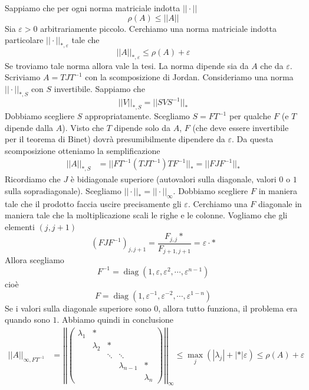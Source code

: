 \documentclass[a4paper]{article}
\begin{document}
\begin{snippetproof}{}
    Sappiamo che per ogni norma matriciale indotta \(||\cdot||\) \[
        \rho(A) \leq ||A||
    \]
    Sia \(\varepsilon > 0\) arbitrariamente piccolo.
    Cerchiamo una norma matriciale indotta particolare
    \(||\cdot||_{\ast, \varepsilon}\) tale che
    \[
        ||A||_{\ast, \varepsilon} \leq \rho(A) + \varepsilon
    \]
    Se troviamo tale norma allora vale la tesi.
    La norma dipende sia da \(A\) che da \(\varepsilon\).
    Scriviamo \(A = TJT^{-1}\) con la scomposizione di Jordan.
    Consideriamo una norma \(||\cdot||_{\ast, S}\) con \(S\) invertibile. Sappiamo che
    \[
        ||V||_{\ast, S} = ||SVS^{-1}||_\ast
    \]
    Dobbiamo scegliere \(S\) appropriatamente.
    Scegliamo \(S = F T^{-1}\) per qualche \(F\) (e \(T\) dipende dalla \(A\)).
    Visto che \(T\) dipende solo da \(A\), \(F\) (che deve essere invertibile per il teorema di Binet)
    dovrà presumibilmente dipendere da \(\varepsilon\).
    Da questa scomposizione otteniamo la semplificazione
    \begin{align*}
        ||A||_{\ast, S} &= ||FT^{-1}(TJT^{-1})TF^{-1}||_{\ast}
        = ||FJF^{-1}||_\ast
    \end{align*}
    Ricordiamo che \(J\) è bidiagonale superiore (autovalori sulla diagonale, valori \(0\) o \(1\) sulla sopradiagonale).
    Scegliamo \(||\cdot||_\ast = ||\cdot||_\infty\).
    Dobbiamo scegliere \(F\) in maniera tale che il prodotto faccia uscire precisamente gli \(\varepsilon\).
    Cerchiamo una \(F\) diagonale in maniera tale che la moltiplicazione scali le righe e le colonne.
    Vogliamo che gli elementi \((j,j+1)\)
    \[
        (FJF^{-1})_{j,j+1} =
        \frac{F_{j,j}\ast}{F_{j+1, j+1}} = \varepsilon \cdot \ast
    \]
    Allora scegliamo
    \[
        F^{-1} = \operatorname{diag}(1, \varepsilon, \varepsilon^2, \cdots, \varepsilon^{n-1})
    \]
    cioè
    \[
        F = \operatorname{diag}(1, \varepsilon^{-1}, \varepsilon^{-2}, \cdots, \varepsilon^{1-n})
    \]
    Se i valori sulla diagonale superiore sono \(0\), allora tutto funziona, il problema era quando sono \(1\).
    Abbiamo quindi in conclusione
    \begin{align*}
        ||A||_{\infty, FT^{-1}} &=
        \left|\left|
        \begin{pmatrix}
            \lambda_1 & \ast & & & \\
            & \lambda_2 & \ast & & \\
            & & \ddots & \ddots &  \\
            & & & \lambda_{n-1} & \ast \\
            & & & & \lambda_n
        \end{pmatrix}
        \right|\right|_\infty \leq \max_j (|\lambda_j| + |\ast|\varepsilon) \leq \rho(A) + \varepsilon
    \end{align*}
\end{snippetproof}
\end{document}
